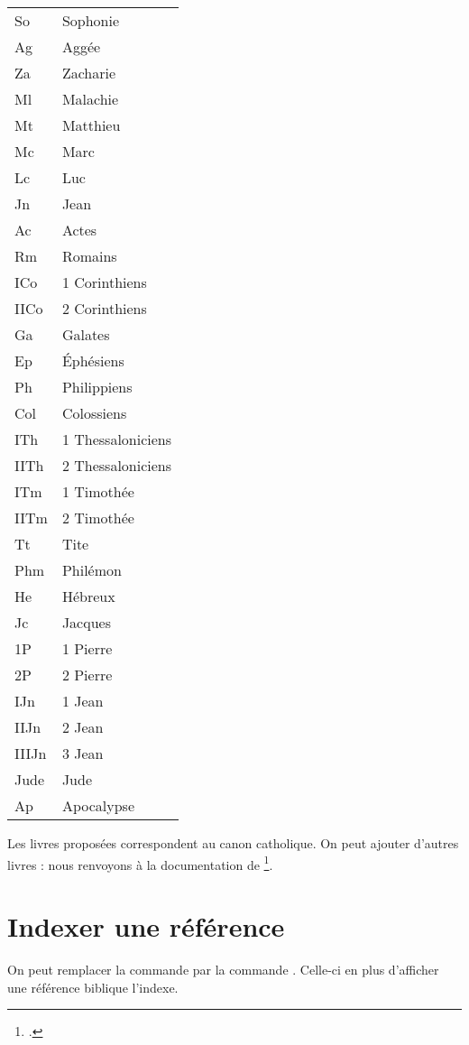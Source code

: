 \begin{longtable}{|l|l|}
So	&	Sophonie\\
Ag	&	Aggée\\
Za	&	Zacharie\\
Ml	&	Malachie\\
Mt	&	Matthieu\\
Mc	&	Marc\\
Lc	&	Luc\\
Jn	&	Jean\\
Ac	&	Actes\\
Rm	&	Romains\\
ICo	&	1 Corinthiens\\
IICo	&	2 Corinthiens\\
Ga	&	Galates\\
Ep	&	Éphésiens\\
Ph	&	Philippiens\\
Col	&	Colossiens\\
ITh	&	1 Thessaloniciens\\
IITh	&	2 Thessaloniciens\\
ITm	&	1 Timothée\\
IITm	&	2 Timothée\\
Tt	&	Tite\\
Phm	&	Philémon\\
He	&	Hébreux\\
Jc	&	Jacques\\
1P	&	1 Pierre\\
2P	&	2 Pierre\\
IJn	&	1 Jean\\
IIJn	&	2 Jean\\
IIIJn	&	3 Jean\\
Jude	&	Jude\\
Ap	&	Apocalypse\\
\end{longtable}

\begin{plusloins}
Les livres proposées correspondent au canon catholique. On peut ajouter d'autres livres : nous renvoyons à la documentation de \footcite{bibleref_nouveauxlivres}.


\end{plusloins}

\section{Indexer une référence}

On peut remplacer la commande  par la commande . Celle-ci en plus d'afficher une référence biblique l'indexe.

